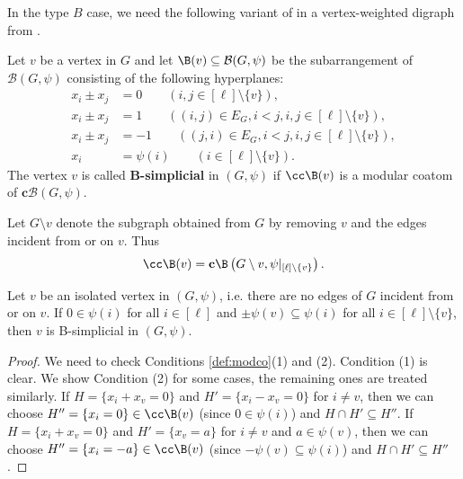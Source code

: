 In the type $B$ case, we need the following variant of  in a vertex-weighted digraph from \cite[Definition 3.10]{ATT24}. 

\begin{definition}
\label{def:B-simplicial}
Let $v$ be a vertex in $G$ and let $\B(v) \subseteq \mathcal{B}(G,\psi)$ be the subarrangement of $\mathcal{B}(G,\psi)$ consisting of the following hyperplanes:
\begin{align*}
x_{i}\pm x_{j} &= 0 \qquad (i,j\in [\ell]\setminus\{v\}), \\
x_{i}\pm x_{j} &= 1\qquad ((i,j) \in E_{G},i<j,  i,j\in [\ell]\setminus\{v\}), \\
x_{i}\pm x_{j} &= -1 \qquad ((j,i) \in E_{G},i<j,  i,j\in [\ell]\setminus\{v\}), \\
 x_{i} &= \psi(i) \qquad (i\in [\ell]\setminus\{v\}). 
\end{align*}
The vertex $ v $ is called \textbf{B-simplicial} in $ (G,\psi) $ if $\cc\B(v)$ is a modular coatom of $ \mathbf{c}\mathcal{B}(G,\psi) $.
\end{definition}

Let  $ G\setminus v $ denote the subgraph obtained from $G$ by removing $ v $ and the edges incident from or on $v$.  
Thus 
$$\cc\B(v)=\mathbf{c}\B\left(G\setminus v, \psi|_{[\ell]\setminus\{v\}}\right) .$$ 

\begin{proposition}
 \label{prop:isolated}
 Let  $ v $ be an isolated vertex in $(G,\psi)$, i.e. there are no edges of $G$ incident from or on $v$. 
If $0 \in \psi(i) $ for all $ i \in [\ell] $ and $ \pm\psi(v) \subseteq \psi(i) $ for all $ i\in [\ell]\setminus\{v\}$, then $ v $ is B-simplicial in $ (G,\psi) $. 
\end{proposition}
\begin{proof}
We need to check Conditions \ref{def:modco}(1) and (2). 
Condition (1) is clear. 
We show Condition (2) for some cases, the remaining ones are treated similarly. 
If $H=\{x_i +x_v =0\}$ and $H'=\{x_i -x_v =0\}$ for $i\ne v$, then we can choose $H'' = \{x_i =0\} \in \cc\B(v)$ (since  $0 \in \psi(i) $) and $ H\cap H'\subseteq H''$.  
If $H=\{x_i +x_v =0\}$ and $H'=\{x_v =a\}$ for $i\ne v$ and $a \in \psi(v)$, then we can choose $H'' = \{x_i =-a\} \in \cc\B(v)$ (since  $-\psi(v) \subseteq \psi(i)  $) and $ H\cap H'\subseteq H''$.
\end{proof}

